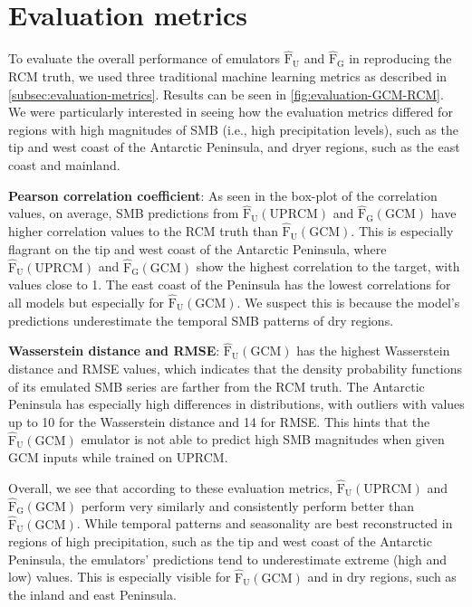 \documentclass[a4paper,11pt,oneside]{report}
\begin{document}
\section{Evaluation metrics}
To evaluate the overall performance of emulators   $\mathrm{\hat{F}_{U}}$ and $\mathrm{\hat{F}_{G}}$ in reproducing the RCM truth, we used three traditional machine learning metrics as described in \autoref{subsec:evaluation-metrics}. Results can be seen in \autoref{fig:evaluation-GCM-RCM}. We were particularly interested in seeing how the evaluation metrics differed for regions with high magnitudes of SMB (i.e., high precipitation levels), such as the tip and west coast of the Antarctic Peninsula, and dryer regions, such as the east coast and mainland. 

\textbf{Pearson correlation coefficient}: As seen in the box-plot of the correlation values, on average, SMB predictions from $\mathrm{\hat{F}_{U}(UPRCM)}$ and $\mathrm{\hat{F}_{G}(GCM)}$ have higher correlation values to the RCM truth than $\mathrm{\hat{F}_{U}(GCM)}$. This is especially flagrant on the tip and west coast of the Antarctic Peninsula, where $\mathrm{\hat{F}_{U}(UPRCM)}$ and $\mathrm{\hat{F}_{G}(GCM)}$ show the highest correlation to the target, with values close to 1. The east coast of the Peninsula has the lowest correlations for all models but especially for $\mathrm{\hat{F}_{U}(GCM)}$. We suspect this is because the model's predictions underestimate the temporal SMB patterns of dry regions. 

 \textbf{Wasserstein distance and RMSE}: $\mathrm{\hat{F}_{U}(GCM)}$ has the highest Wasserstein distance and RMSE values, which indicates that the density probability functions of its emulated SMB series are farther from the RCM truth. The Antarctic Peninsula has especially high differences in distributions, with outliers with values up to 10 for the Wasserstein distance and 14 for RMSE. This hints that the $\mathrm{\hat{F}_{U}(GCM)}$ emulator is not able to predict high SMB magnitudes when given GCM inputs while trained on UPRCM.   


Overall, we see that according to these evaluation metrics, $\mathrm{\hat{F}_{U}(UPRCM)}$ and $\mathrm{\hat{F}_{G}(GCM)}$ perform very similarly and consistently perform better than $\mathrm{\hat{F}_{U}(GCM)}$. While temporal patterns and seasonality are best reconstructed in regions of high precipitation, such as the tip and west coast of the Antarctic Peninsula, the emulators' predictions tend to underestimate extreme (high and low) values. This is especially visible for $\mathrm{\hat{F}_{U}(GCM)}$ and in dry regions, such as the inland and east Peninsula. 
\end{document}
